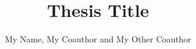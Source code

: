 \documentclass[lof,lot,los,12pt,advisercopy]{puseniorthesis}
\author{My Name, My Coauthor and My Other Coauthor}
\title{Thesis Title}
\numberwithin{equation}{section}
\begin{document}



\nocite{*}

\appendix

\end{document}
